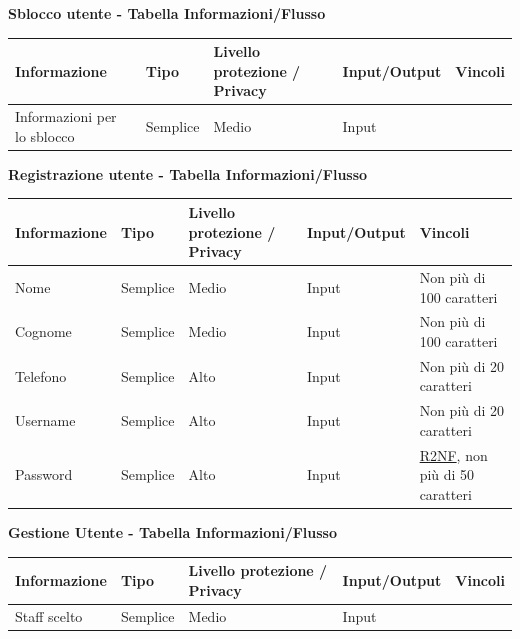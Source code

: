 \documentclass[a4paper]{article}
\begin{document}
\textbf{Sblocco utente  - Tabella Informazioni/Flusso}

\begin{center}
    \begin{tabularx}{1\textwidth}{|X|l|X|X|X|}
        \hline
        \textbf{Informazione} &\textbf{Tipo} & \textbf{Livello protezione / Privacy} & \textbf{Input/Output} & \textbf{Vincoli}\\
        \hline
        \hline
        Informazioni per lo sblocco & Semplice & Medio & Input & \\
        \hline
    \end{tabularx}
\end{center}

\textbf{Registrazione utente  - Tabella Informazioni/Flusso}

\begin{center}
    \begin{tabularx}{1\textwidth}{|X|l|X|X|X|}
        \hline
        \textbf{Informazione} &\textbf{Tipo} & \textbf{Livello protezione / Privacy} & \textbf{Input/Output} & \textbf{Vincoli}\\
        \hline
        \hline
        Nome & Semplice & Medio & Input & Non più di 100 caratteri\\
        \hline
        Cognome & Semplice & Medio & Input & Non più di 100 caratteri\\
        \hline
        Telefono & Semplice & Alto & Input & Non più di 20 caratteri\\
        \hline
        Username & Semplice & Alto & Input & Non più di 20 caratteri\\
        \hline
        Password & Semplice & Alto & Input & \hyperlink{R2NF}{R2NF}, non più di 50 caratteri\\
        \hline
    \end{tabularx}
\end{center}

\newpage

\textbf{Gestione Utente - Tabella Informazioni/Flusso}

\begin{center}
    \begin{tabularx}{1\textwidth}{|X|l|X|X|X|}
        \hline
        \textbf{Informazione} &\textbf{Tipo} & \textbf{Livello protezione / Privacy} & \textbf{Input/Output} & \textbf{Vincoli}\\
        \hline
        \hline
        Staff scelto & Semplice & Medio & Input & \\
        \hline
    \end{tabularx}
\end{center}
\end{document}
